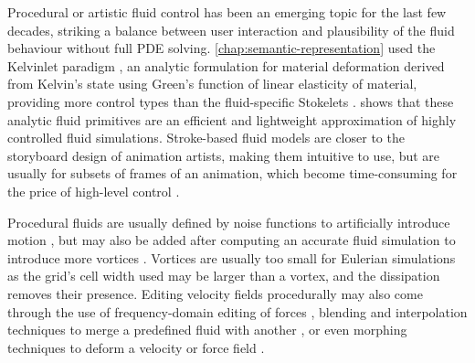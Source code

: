 
Procedural or artistic fluid control has been an emerging topic for the last few decades, striking a balance between user interaction and plausibility of the fluid behaviour without full PDE solving. \cref{chap:semantic-representation} used the Kelvinlet paradigm \cite{DeGoes2017}, an analytic formulation for material deformation derived from Kelvin's state using Green's function of linear elasticity of material, providing more control types than the fluid-specific Stokelets \cite{Chwang1976}. \cite{Wejchert1991} shows that these analytic fluid primitives are an efficient and lightweight approximation of highly controlled fluid simulations. Stroke-based fluid models are closer to the storyboard design of animation artists, making them intuitive to use, but are usually for subsets of frames of an animation, which become time-consuming for the price of high-level control \cite{Xing2016,Patel2005,Yan2020b,Pan2013}. 

Procedural fluids are usually defined by noise functions to artificially introduce motion \cite{Bridson2007c}, but may also be added after computing an accurate fluid simulation to introduce more vortices \cite{Wang2025}. Vortices are usually too small for Eulerian simulations as the grid's cell width used may be larger than a vortex, and the dissipation removes their presence. Editing velocity fields procedurally may also come through the use of frequency-domain editing of forces \cite{Forootaninia2020, Tang2021}, blending and interpolation techniques to merge a predefined fluid with another \cite{Raveendran2014}, or even morphing techniques to deform a velocity or force field \cite{Lu2019,Raveendran2012,Flynn2019}.


